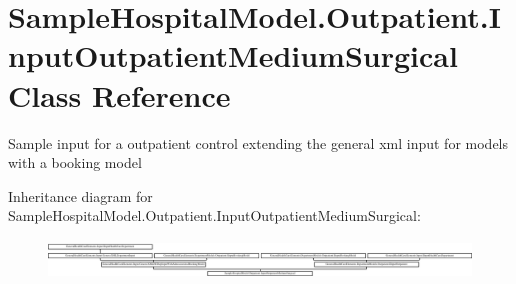\hypertarget{class_sample_hospital_model_1_1_outpatient_1_1_input_outpatient_medium_surgical}{}\section{Sample\+Hospital\+Model.\+Outpatient.\+Input\+Outpatient\+Medium\+Surgical Class Reference}
\label{class_sample_hospital_model_1_1_outpatient_1_1_input_outpatient_medium_surgical}


Sample input for a outpatient control extending the general xml input for models with a booking model  


Inheritance diagram for Sample\+Hospital\+Model.\+Outpatient.\+Input\+Outpatient\+Medium\+Surgical\+:\begin{figure}[H]
\begin{center}
\leavevmode
\includegraphics[height=1.040892cm]{class_sample_hospital_model_1_1_outpatient_1_1_input_outpatient_medium_surgical}
\end{center}
\end{figure}
